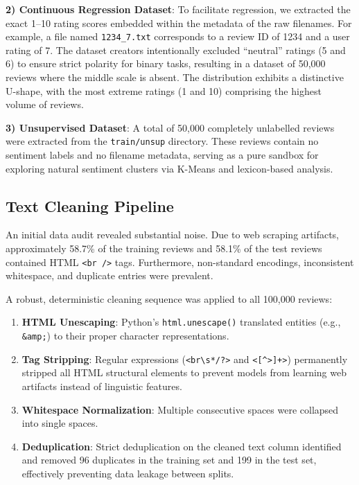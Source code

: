 \documentclass[conference]{IEEEtran}
\begin{document}
\textbf{2) Continuous Regression Dataset}: 
To facilitate regression, we extracted the exact 1--10 rating scores embedded within the metadata of the raw filenames. For example, a file named \texttt{1234\_7.txt} corresponds to a review ID of 1234 and a user rating of 7. The dataset creators intentionally excluded ``neutral'' ratings (5 and 6) to ensure strict polarity for binary tasks, resulting in a dataset of 50,000 reviews where the middle scale is absent. The distribution exhibits a distinctive U-shape, with the most extreme ratings (1 and 10) comprising the highest volume of reviews.

\textbf{3) Unsupervised Dataset}: 
A total of 50,000 completely unlabelled reviews were extracted from the \texttt{train/unsup} directory. These reviews contain no sentiment labels and no filename metadata, serving as a pure sandbox for exploring natural sentiment clusters via K-Means and lexicon-based analysis.

\subsection{Text Cleaning Pipeline}
An initial data audit revealed substantial noise. Due to web scraping artifacts, approximately 58.7\% of the training reviews and 58.1\% of the test reviews contained HTML \texttt{<br />} tags. Furthermore, non-standard encodings, inconsistent whitespace, and duplicate entries were prevalent.

A robust, deterministic cleaning sequence was applied to all 100,000 reviews:
\begin{enumerate}
    \item \textbf{HTML Unescaping}: Python's \texttt{html.unescape()} translated entities (e.g., \texttt{\&amp;}) to their proper character representations.
    \item \textbf{Tag Stripping}: Regular expressions (\texttt{<br\textbackslash s*/?>} and \texttt{<[{\textasciicircum}>]+>}) permanently stripped all HTML structural elements to prevent models from learning web artifacts instead of linguistic features.
    \item \textbf{Whitespace Normalization}: Multiple consecutive spaces were collapsed into single spaces.
    \item \textbf{Deduplication}: Strict deduplication on the cleaned text column identified and removed 96 duplicates in the training set and 199 in the test set, effectively preventing data leakage between splits.
\end{enumerate}
\end{document}
